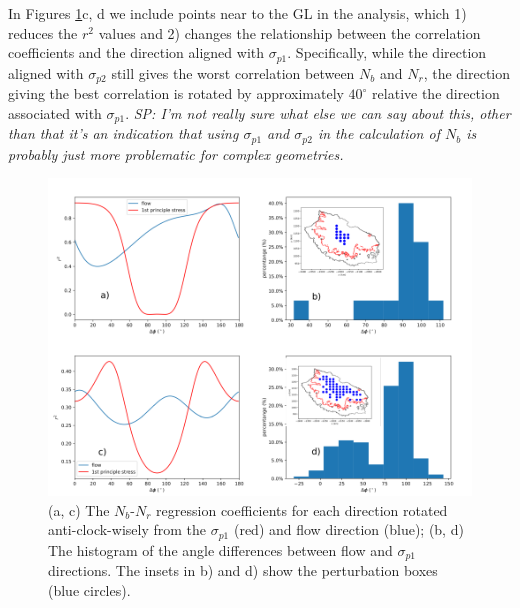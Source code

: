 \documentclass[review,oneside]{igs}
\begin{document}
In Figures \ref{fig7}c, d we include points near to the GL in the analysis, which 1) reduces the $r^2$ values and 2) changes the relationship between the correlation coefficients and the direction aligned with $\sigma_{p1}$. Specifically, while the direction aligned with $\sigma_{p2}$ still gives the worst correlation between $N_b$ and $N_r$, the direction giving the best correlation is rotated by approximately $40^\circ$ relative the direction associated with $\sigma_{p1}$. \textit{SP: I'm not really sure what else we can say about this, other than that it's an indication that using $\sigma_{p1}$ and $\sigma_{p2}$ in the calculation of $N_b$ is probably just more problematic for complex geometries.} 

\begin{figure}
	\centering
    \includegraphics[width=1\linewidth]{figs/fig7_new.pdf}
    \caption{(a, c) The $N_b$-$N_r$ regression coefficients for each direction rotated anti-clock-wisely from the $\sigma_{p1}$ (red) and flow direction (blue); (b, d) The histogram of the angle differences between flow and $\sigma_{p1}$ directions. The insets in b) and d) show the perturbation boxes (blue circles).}
	\label{fig7}
\end{figure}
\end{document}
